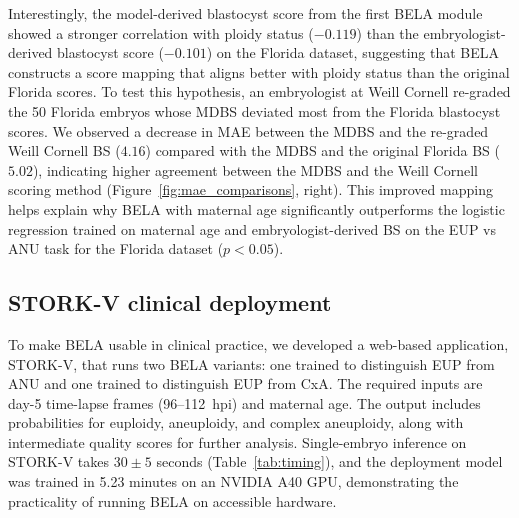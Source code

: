 \documentclass[10pt]{article}
\begin{document}
Interestingly, the model-derived blastocyst score from the first BELA module
showed a stronger correlation with ploidy status ($-0.119$) than the
embryologist-derived blastocyst score ($-0.101$) on the Florida dataset,
suggesting that BELA constructs a score mapping that aligns better with
ploidy status than the original Florida scores. To test this hypothesis, an
embryologist at Weill Cornell re-graded the 50 Florida embryos whose MDBS
deviated most from the Florida blastocyst scores. We observed a decrease in
MAE between the MDBS and the re-graded Weill Cornell BS ($4.16$) compared
with the MDBS and the original Florida BS ($5.02$), indicating higher
agreement between the MDBS and the Weill Cornell scoring method
(Figure~\ref{fig:mae_comparisons}, right). This improved mapping helps explain
why BELA with maternal age significantly outperforms the logistic regression
trained on maternal age and embryologist-derived BS on the EUP vs ANU task
for the Florida dataset ($p < 0.05$).

\subsection{STORK-V clinical deployment}
To make BELA usable in clinical practice, we developed a web-based application,
STORK-V, that runs two BELA variants: one trained to distinguish EUP from ANU
and one trained to distinguish EUP from CxA. The required inputs are day-5
time-lapse frames (96--112~hpi) and maternal age. The output includes
probabilities for euploidy, aneuploidy, and complex aneuploidy, along with
intermediate quality scores for further analysis. Single-embryo inference on
STORK-V takes $30 \pm 5$ seconds (Table~\ref{tab:timing}), and the deployment
model was trained in 5.23 minutes on an NVIDIA A40 GPU, demonstrating the
practicality of running BELA on accessible hardware.
\end{document}
